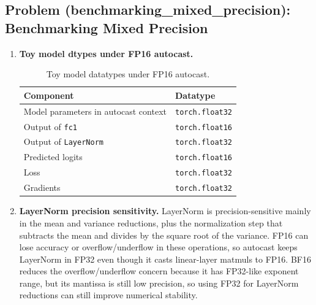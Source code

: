 \documentclass[11pt]{article}
\begin{document}
\subsection{Problem (benchmarking\_mixed\_precision): Benchmarking Mixed Precision}

\begin{enumerate}
  \item \textbf{Toy model dtypes under FP16 autocast.}
  \begin{table}[H]
    \centering
    \caption{Toy model datatypes under FP16 autocast.}
    \begin{tabular}{ll}
      \toprule
      Component & Datatype \\
      \midrule
      Model parameters in autocast context & \texttt{torch.float32} \\
      Output of \texttt{fc1} & \texttt{torch.float16} \\
      Output of \texttt{LayerNorm} & \texttt{torch.float32} \\
      Predicted logits & \texttt{torch.float16} \\
      Loss & \texttt{torch.float32} \\
      Gradients & \texttt{torch.float32} \\
      \bottomrule
    \end{tabular}
  \end{table}

  \item \textbf{LayerNorm precision sensitivity.}
  LayerNorm is precision-sensitive mainly in the mean and variance reductions, plus the normalization step that subtracts the mean and divides by the square root of the variance. FP16 can lose accuracy or overflow/underflow in these operations, so autocast keeps LayerNorm in FP32 even though it casts linear-layer matmuls to FP16. BF16 reduces the overflow/underflow concern because it has FP32-like exponent range, but its mantissa is still low precision, so using FP32 for LayerNorm reductions can still improve numerical stability.


\end{enumerate}
\end{document}
